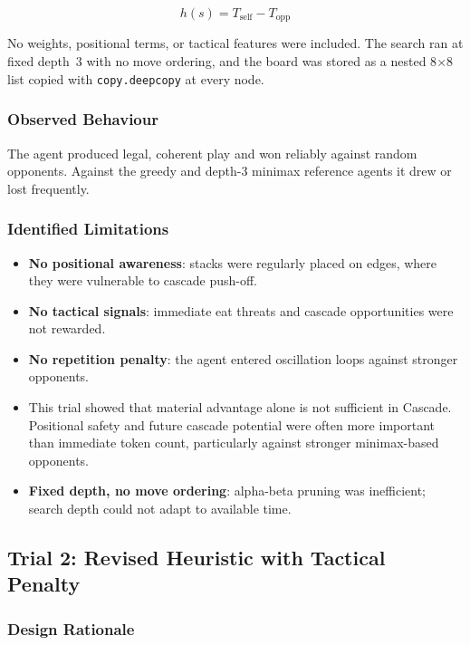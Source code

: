 \documentclass[10.5pt,a4paper]{article}
\begin{document}
\begin{equation}
h(s) = T_{\text{self}} - T_{\text{opp}}
\end{equation}

No weights, positional terms, or tactical features were included. The search ran at fixed depth~3 with no move ordering, and the board was stored as a nested 8$\times$8 list copied with \texttt{copy.deepcopy} at every node.

\subsubsection{Observed Behaviour}

The agent produced legal, coherent play and won reliably against random opponents. Against the greedy and depth-3 minimax reference agents it drew or lost frequently.

\subsubsection{Identified Limitations}

\begin{itemize}[noitemsep]
    \item \textbf{No positional awareness}: stacks were regularly placed on edges, where they were vulnerable to cascade push-off.
    \item \textbf{No tactical signals}: immediate eat threats and cascade opportunities were not rewarded.
    \item \textbf{No repetition penalty}: the agent entered oscillation loops against stronger opponents.
    \item This trial showed that material advantage alone is not sufficient in Cascade. Positional safety and future cascade potential were often more important than immediate token count, particularly against stronger minimax-based opponents.
    \item \textbf{Fixed depth, no move ordering}: alpha-beta pruning was inefficient; search depth could not adapt to available time.
\end{itemize}

\subsection{Trial 2: Revised Heuristic with Tactical Penalty}

\subsubsection{Design Rationale}
\end{document}
